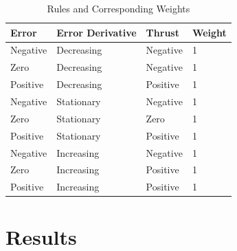 \documentclass[12pt]{article}
\begin{document}
\begin{table}[h!]
    \centering
    \renewcommand{\arraystretch}{1.25} %
    \setlength{\tabcolsep}{10pt}      %
    \begin{tabular}{|p{3cm}|p{4cm}|p{3cm}|p{2cm}|}
    \hline
    \textbf{\large Error} & \textbf{\large Error Derivative} & \textbf{\large Thrust} & \textbf{\large Weight} \\ \hline
    \large Negative       & \large Decreasing                & \large Negative        & \large 1               \\ \hline
    \large Zero           & \large Decreasing                & \large Negative        & \large 1               \\ \hline
    \large Positive       & \large Decreasing                & \large Positive        & \large 1               \\ \hline
    \large Negative       & \large Stationary                & \large Negative        & \large 1               \\ \hline
    \large Zero           & \large Stationary                & \large Zero            & \large 1               \\ \hline
    \large Positive       & \large Stationary                & \large Positive        & \large 1               \\ \hline
    \large Negative       & \large Increasing                & \large Negative        & \large 1               \\ \hline
    \large Zero           & \large Increasing                & \large Positive        & \large 1               \\ \hline
    \large Positive       & \large Increasing                & \large Positive        & \large 1               \\ \hline
    \end{tabular}
    \caption{Rules and Corresponding Weights}
    \label{tab:rules}
\end{table}
    
    
    

\section{Results}
\end{document}
